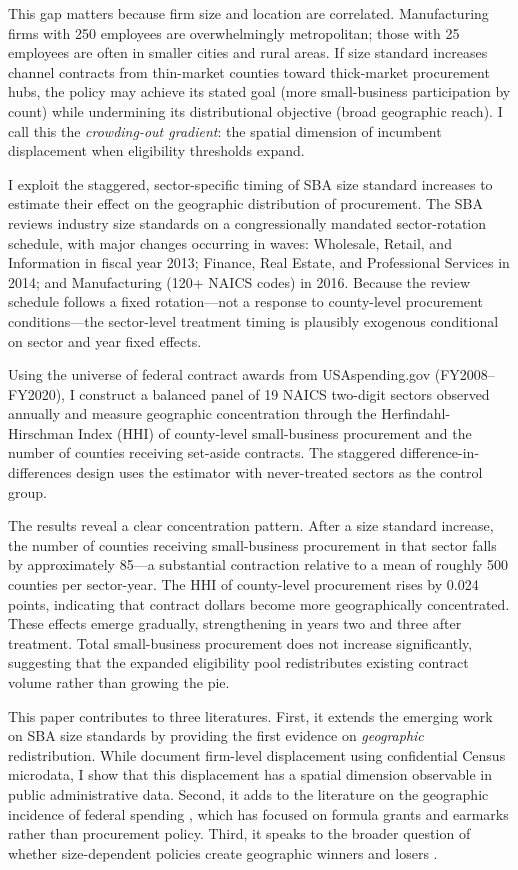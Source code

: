 \documentclass[12pt]{article}
\begin{document}
This gap matters because firm size and location are correlated. Manufacturing firms with 250 employees are overwhelmingly metropolitan; those with 25 employees are often in smaller cities and rural areas. If size standard increases channel contracts from thin-market counties toward thick-market procurement hubs, the policy may achieve its stated goal (more small-business participation by count) while undermining its distributional objective (broad geographic reach). I call this the \emph{crowding-out gradient}: the spatial dimension of incumbent displacement when eligibility thresholds expand.

I exploit the staggered, sector-specific timing of SBA size standard increases to estimate their effect on the geographic distribution of procurement. The SBA reviews industry size standards on a congressionally mandated sector-rotation schedule, with major changes occurring in waves: Wholesale, Retail, and Information in fiscal year 2013; Finance, Real Estate, and Professional Services in 2014; and Manufacturing (120+ NAICS codes) in 2016. Because the review schedule follows a fixed rotation---not a response to county-level procurement conditions---the sector-level treatment timing is plausibly exogenous conditional on sector and year fixed effects.

Using the universe of federal contract awards from USAspending.gov (FY2008--FY2020), I construct a balanced panel of 19 NAICS two-digit sectors observed annually and measure geographic concentration through the Herfindahl-Hirschman Index (HHI) of county-level small-business procurement and the number of counties receiving set-aside contracts. The staggered difference-in-differences design uses the \citet{callaway2021} estimator with never-treated sectors as the control group.

The results reveal a clear concentration pattern. After a size standard increase, the number of counties receiving small-business procurement in that sector falls by approximately 85---a substantial contraction relative to a mean of roughly 500 counties per sector-year. The HHI of county-level procurement rises by 0.024 points, indicating that contract dollars become more geographically concentrated. These effects emerge gradually, strengthening in years two and three after treatment. Total small-business procurement does not increase significantly, suggesting that the expanded eligibility pool redistributes existing contract volume rather than growing the pie.

This paper contributes to three literatures. First, it extends the emerging work on SBA size standards \citep{denes2024, brown2017} by providing the first evidence on \emph{geographic} redistribution. While \citet{denes2024} document firm-level displacement using confidential Census microdata, I show that this displacement has a spatial dimension observable in public administrative data. Second, it adds to the literature on the geographic incidence of federal spending \citep{clemens2022, suarez2016}, which has focused on formula grants and earmarks rather than procurement policy. Third, it speaks to the broader question of whether size-dependent policies create geographic winners and losers \citep{garicano2016, gourio2017, hsieh2014}.
\end{document}
